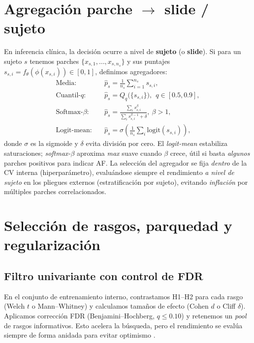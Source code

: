 \section{Agregación parche $\rightarrow$ slide / sujeto}
\label{sec:agg}

En inferencia clínica, la decisión ocurre a nivel de \textbf{sujeto} (o \textbf{slide}). Si para un sujeto $s$ tenemos parches $\{x_{s,1},\dots,x_{s,n_s}\}$ y sus puntajes $s_{s,i}=f_\theta(\phi(x_{s,i}))\in[0,1]$, definimos agregadores:
\begin{align}
\text{Media:}\quad & \hat{p}_s=\frac{1}{n_s}\sum_{i=1}^{n_s} s_{s,i},\\
\text{Cuantil-$q$:}\quad & \hat{p}_s=Q_q\big(\{s_{s,i}\}\big),\ \ q\in[0.5,0.9],\\
\text{Softmax-$\beta$:}\quad & \hat{p}_s=\frac{\sum_i s_{s,i}^\beta}{\sum_i s_{s,i}^{\beta-1} + \delta},\ \beta>1,\\
\text{Logit-mean:}\quad & \hat{p}_s=\sigma\!\left(\frac{1}{n_s}\sum_{i}\mathrm{logit}(s_{s,i})\right),
\end{align}
donde $\sigma$ es la sigmoide y $\delta$ evita división por cero. El \emph{logit-mean} estabiliza saturaciones; \emph{softmax-$\beta$} aproxima \emph{max} suave cuando $\beta$ crece, útil si basta \emph{algunos} parches positivos para indicar AF. La selección del agregador se fija \emph{dentro} de la CV interna (hiperparámetro), evaluándose siempre el rendimiento \emph{a nivel de sujeto} en los pliegues externos (estratificación por sujeto), evitando \emph{inflación} por múltiples parches correlacionados.

\section{Selección de rasgos, parquedad y regularización}
\label{sec:feature_selection}

\subsection{Filtro univariante con control de FDR}
En el conjunto de entrenamiento interno, contrastamos H1–H2 para cada rasgo (Welch $t$ o Mann–Whitney) y calculamos tamaños de efecto (Cohen $d$ o Cliff $\delta$). Aplicamos corrección FDR (Benjamini–Hochberg, $q\le 0.10$) y retenemos un \emph{pool} de rasgos informativos. Esto acelera la búsqueda, pero el rendimiento se evalúa siempre de forma anidada para evitar optimismo \cite{Tsamardinos2022Patterns}.

